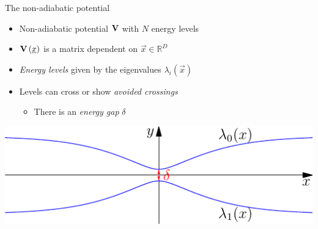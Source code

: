 \documentclass{beamer}
\begin{document}
\begin{frame}{The non-adiabatic potential}
  \begin{itemize}
  \item Non-adiabatic potential $\mathbf{V}$ with $N$ energy levels
  \item $\mathbf{V}\left(\underline{x}\right)$ is a matrix dependent on $\vec{x}\in\mathbb{R}^D$
  \item \emph{Energy levels} given by the eigenvalues $\lambda_i\left(\vec{x}\right)$
  \item Levels can cross or show \emph{avoided crossings}
    \begin{itemize}
    \item There is an \emph{energy gap} $\delta$
    \end{itemize}
  \end{itemize}
  \begin{center}
    \includegraphics[scale=0.8]{./fig/potential.pdf}
  \end{center}
\end{frame}
\end{document}
